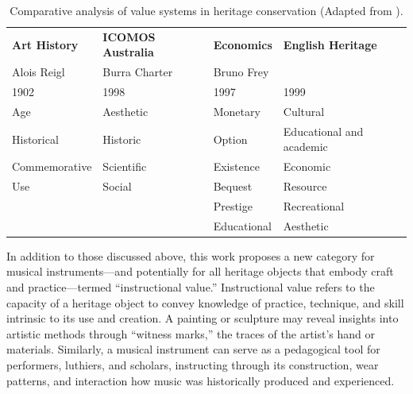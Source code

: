 \begin{table}[h]
	\small
	\centering
	\begin{tabular}{llll}
		\toprule
		\textbf{Art History} & \textbf{ICOMOS Australia} & \textbf{Economics} &
		\textbf{English Heritage}
		\\
		Alois Reigl          & Burra Charter             & Bruno Frey         &
		\\
		1902                 & 1998                      & 1997               &
		1999                                                                    \\
		\hline
		Age                  & Aesthetic                 & Monetary           &
		Cultural                                                                \\
		Historical           & Historic                  & Option             &
		Educational and academic                                                \\
		Commemorative        & Scientific                & Existence          &
		Economic                                                                \\
		Use                  & Social                    & Bequest            &
		Resource                                                                \\
		                     &                           & Prestige           &
		Recreational                                                            \\
		                     &                           & Educational        &
		Aesthetic                                                               \\
		\bottomrule
	\end{tabular}
	\caption[Comparative analysis of value systems in heritage
		conservation]{Comparative analysis of value systems in heritage conservation
		(Adapted from \textcite{avrami_values_2000}).}
	\label{tab:values_comparison}
\end{table}

In addition to those discussed above, this work proposes a new category for
musical instruments---and potentially for all heritage objects that embody craft
and practice---termed ``instructional value.'' Instructional value refers to the
capacity of a heritage object to convey knowledge of practice, technique, and
skill intrinsic to its use and creation. A painting or sculpture may reveal
insights into artistic methods through ``witness marks,'' the traces of the
artist’s hand or materials. Similarly, a musical instrument can serve as a
pedagogical tool for performers, luthiers, and scholars, instructing through its
construction, wear patterns, and interaction how music was historically produced
and experienced.

